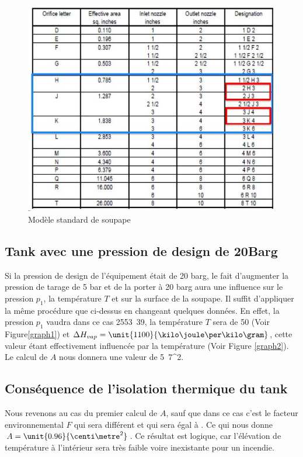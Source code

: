 \begin{figure}[ht!]
\centering
\includegraphics[scale=0.4]{tab.jpg}
\caption{Modèle standard de soupape}
\label{tab}
\end{figure}

\subsection{Tank avec une pression de design de \unit{20}{Barg}}
Si la pression de design de l’équipement était de 20 barg, le fait d’augmenter la pression de tarage de 5 bar et de la porter à 20 barg aura une influence sur le pression $p_1$, la température $T$ et sur la surface de la soupape.
Il suffit d'appliquer la même procédure que ci-dessus en changeant quelques données. En effet, la pression $p_1$ vaudra dans ce cas \unit{2553.39}{\kilo \pascal}, la température $T$ sera de \unit{50}{\celsius} (Voir Figure\ref{graph1}) et $\Delta H_{vap}=\unit{1100}{\kilo \joule \per \kilo \gram}$, cette valeur étant effectivement influencée par la température (Voir Figure \ref{graph2}). Le calcul de $A$ nous donnera une valeur de \unit{5.7}{\centi \metre^2}.

\subsection{Conséquence de l'isolation thermique du tank}

Nous revenons au cas du premier calcul de $A$, sauf que dans ce cas c'est le facteur environnemental $F$ qui sera différent et qui sera égal à . Ce qui nous donne $A=\unit{0.96}{\centi \metre^2}$. Ce résultat est logique, car l'élévation de température à l'intérieur sera très faible voire inexistante pour un incendie.

